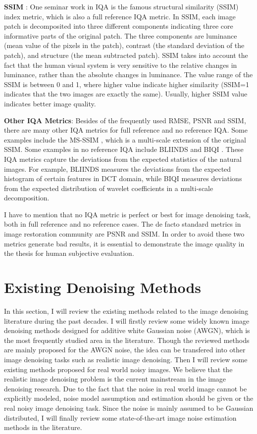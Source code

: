 \textbf{SSIM} \cite{ssim}: One seminar work in IQA is the famous structural similarity (SSIM) index metric, which is also a full reference IQA metric. In SSIM, each image patch is decomposited into three different components indicating three core informative parts of the original patch. The three components are luminance (mean value of the pixels in the patch), contrast (the standard deviation of the patch), and structure (the mean subtracted patch). SSIM takes into account the fact that the human visual system is very sensitive to the relative changes in luminance, rather than the absolute changes in luminance. The value range of the SSIM is between 0 and 1, where higher value indicate higher similarity (SSIM=1 indicates that the two images are exactly the same). Usually, higher SSIM value indicates better image quality. 

\textbf{Other IQA Metrics}: Besides of the frequently used RMSE, PSNR and SSIM, there are many other IQA metrics for full reference and no reference IQA. Some examples include the MS-SSIM \cite{msssim}, which is a multi-scale extension of the original SSIM. Some examples in no reference IQA include BLIINDS \cite{bliinds} and BIQI \cite{biqi}. These IQA metrics capture the deviations from the expected statistics of the natural images. For example, BLIINDS measures the deviations from the expected histogram of certain features in DCT domain, while BIQI measures deviations from the expected distribution of wavelet coefficients in a multi-scale decomposition.

I have to mention that no IQA metric is perfect or best for image denoising task, both in full reference and no reference cases. The de facto standard metrics in image restoration community are PSNR and SSIM. In order to avoid these two metrics generate bad results, it is essential to demonstrate the image quality in the thesis for human subjective evaluation.


\section{Existing Denoising Methods}

In this section, I will review the existing methods related to the image denoising literature during the past decades. I will firstly review some widely known image denoising methods designed for additive white Gaussian noise (AWGN), which is the most frequently studied area in the literature. Though the reviewed methods are mainly proposed for the AWGN noise, the idea can be transfered into other image denoising tasks such as realistic image denoising. Then I will review some existing methods proposed for real world noisy images. We believe that the realistic image denoising problem is the current mainstream in the image denoising research. Due to the fact that the noise in real world image cannot be explicitly modeled, noise model assumption and estimation should be given or the real noisy image denoising task. Since the noise is mainly assumed to be Gaussian distributed, I will finally review some state-of-the-art image noise estimation methods in the literature.

